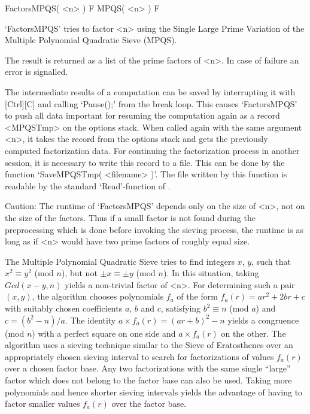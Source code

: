 
\>FactorsMPQS( <n> ) F
\>MPQS( <n> ) F

`FactorsMPQS' tries to factor <n> using the Single Large Prime
Variation of the Multiple Polynomial Quadratic Sieve (MPQS).

The result is returned as a list of the prime factors of <n>.
In case of failure an error is signalled.

The intermediate results of a computation can be saved by
interrupting it with [Ctrl][C] and calling `Pause();'
from the break loop.
This causes `FactorsMPQS' to push all data important
for resuming the computation again as a record <MPQSTmp>
on the options stack.
When called again with the same argument <n>, it takes the record from
the options stack and gets the previously computed factorization data. 
For continuing the factorization process in another 
session, it is necessary to write this record to a file.
This can be done by the function `SaveMPQSTmp( <filename> )'.
The file written by this function is readable by the 
standard `Read'-function of {\GAP}.

Caution: The runtime of `FactorsMPQS' depends only on the size of <n>, 
not on the size of the factors.
Thus if a small factor is not found during the preprocessing
which is done before invoking the sieving process, the runtime is
as long as if <n> would have two prime factors of roughly equal size.

The Multiple Polynomial Quadratic Sieve
tries to find integers $x$, $y$, such that $x^2 \equiv y^2$ (mod $n$),
but not $\pm x \equiv \pm y$ (mod $n$). In this situation,
taking $Gcd(x - y,n)$ yields a non-trivial factor of <n>.
For determining such a pair $(x,y)$, the algorithm chooses polynomials
$f_a$ of the form $f_a(r) = ar^2 + 2br + c$ with suitably chosen
coefficients $a$, $b$ and $c$, satisfying $b^2 \equiv n$ (mod $a$)
and $c = (b^2 - n)/a$.
The identity $a \times f_a(r) = (ar + b)^2 - n$ yields a congruence
(mod $n$) with a perfect square on one side and $a \times f_a(r)$ on
the other. The algorithm uses a sieving technique similar to the
Sieve of Eratosthenes over an appropriately chosen
sieving interval to search for factorizations of values $f_a(r)$
over a chosen factor base. Any two factorizations with the same single
``large'' factor which does not belong to the factor base can also be
used. Taking more polynomials and hence shorter sieving intervals yields
the advantage of having to factor smaller values $f_a(r)$ over the
factor base.

